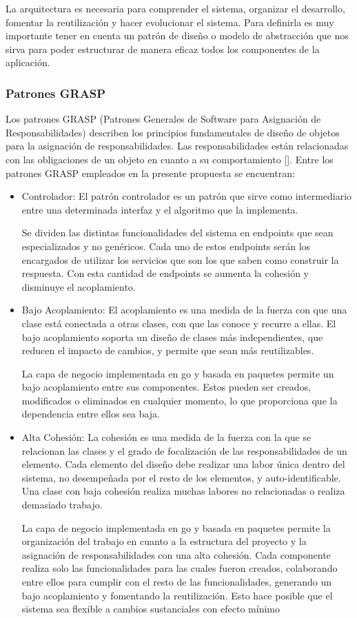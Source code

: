 La arquitectura es necesaria para comprender el sistema, organizar el desarrollo, fomentar la reutilización y hacer evolucionar el sistema. Para definirla es muy importante tener en cuenta un patrón de diseño o modelo de abstracción que nos sirva para poder estructurar de manera eficaz todos los componentes de la aplicación.

\subsubsection{Patrones GRASP}
Los patrones GRASP (Patrones Generales de Software para Asignación de Responsabilidades) describen los principios fundamentales de diseño de objetos para la asignación de responsabilidades. Las responsabilidades  están relacionadas con las obligaciones de un objeto en cuanto a su comportamiento [\cite{97}]. Entre los patrones GRASP empleados en la presente propuesta se encuentran:

\begin{itemize}
    \item Controlador: El patrón controlador es un patrón que sirve como intermediario entre una determinada interfaz y el algoritmo que la implementa. 

	Se dividen las distintas funcionalidades del sistema en endpoints que sean especializados y no genéricos. Cada uno de estos endpoints serán los encargados de utilizar los servicios que son los que saben como construir la respuesta. Con esta cantidad de endpoints se aumenta la cohesión y disminuye el acoplamiento.
	
	\item Bajo Acoplamiento: El acoplamiento es una medida de la fuerza con que una clase está conectada a otras clases, con que las conoce y recurre a ellas. El bajo acoplamiento soporta un diseño de clases más independientes, que reducen el impacto de cambios, y permite que sean más reutilizables.
	
	La capa de negocio implementada en go y basada en paquetes permite un bajo acoplamiento entre sus componentes. Estos pueden ser creados, modificados o eliminados en cualquier momento, lo que proporciona que la dependencia entre ellos sea baja.
	
	\item Alta Cohesión: La cohesión es una medida de la fuerza con la que se relacionan las clases y el grado de focalización de las responsabilidades de un elemento. Cada elemento del diseño debe realizar una labor única dentro del sistema, no desempeñada por el resto de los elementos, y auto-identificable. Una clase con baja cohesión realiza muchas labores no relacionadas o realiza demasiado trabajo.
	
	La capa de negocio implementada en go y basada en paquetes permite la organización del trabajo en cuanto a la estructura del proyecto y la asignación de responsabilidades con una alta cohesión. Cada componente realiza solo las funcionalidades para las cuales fueron creados, colaborando entre ellos para cumplir con el resto de las funcionalidades, generando un bajo acoplamiento y fomentando la reutilización. Esto hace posible que el sistema sea flexible a cambios sustanciales con efecto mínimo
\end{itemize}

